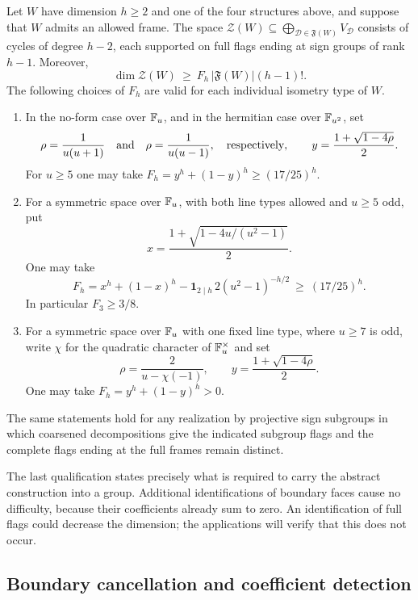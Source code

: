 \begin{theorem}\label{thm:frame-bound}
Let $W$ have dimension $h\geq2$ and one of the four structures above,
and suppose that $W$ admits an allowed frame.  The space
$\mathcal Z(W)\subseteq\bigoplus_{\mathcal D\in\mathfrak F(W)}V_{\mathcal D}$
consists of cycles of degree $h-2$, each supported on full flags ending
at sign groups of rank $h-1$.  Moreover,
\begin{equation}\label{eq:frame-bound}
 \dim\mathcal Z(W)\ \geq\
 F_h\,|\mathfrak F(W)|(h-1)!.
\end{equation}
The following choices of $F_h$ are valid for each individual isometry
type of $W$.
\begin{enumerate}
\item In the no-form case over $\mathbb F_u$, and in the hermitian case over
$\mathbb F_{u^2}$, set
\[
 \rho=\frac1{u(u+1)}\quad\hbox{and}\quad
 \rho=\frac1{u(u-1)},
 \quad\hbox{respectively},\qquad
 y=\frac{1+\sqrt{1-4\rho}}2.
\]
For $u\geq5$ one may take $F_h=y^h+(1-y)^h\geq(17/25)^h$.
\item For a symmetric space over $\mathbb F_u$, with both line types allowed
and $u\geq5$ odd, put
\[
 x=\frac{1+\sqrt{1-4u/(u^2-1)}}2.
\]
One may take
\begin{equation}\label{eq:symmetric-frame-fraction}
 F_h=x^h+(1-x)^h-\mathbf1_{2\mid h}\,2(u^2-1)^{-h/2}
 \ \geq\ (17/25)^h.
\end{equation}
In particular $F_3\geq3/8$.
\item For a symmetric space over $\mathbb F_u$ with one fixed line type,
where $u\geq7$ is odd, write $\chi$ for the quadratic character of
$\mathbb F_u^\times$ and set
\[
 \rho=\frac2{u-\chi(-1)},\qquad
 y=\frac{1+\sqrt{1-4\rho}}2.
\]
One may take $F_h=y^h+(1-y)^h>0$.
\end{enumerate}
The same statements hold for any realization by projective sign
subgroups in which coarsened decompositions give the indicated subgroup
flags and the complete flags ending at the full frames remain distinct.
\end{theorem}

The last qualification states precisely what is required to carry the
abstract construction into a group.  Additional identifications of
boundary faces cause no difficulty, because their coefficients already
sum to zero.  An identification of full flags could decrease the
dimension; the applications will verify that this does not occur.

\subsection{Boundary cancellation and coefficient detection}

